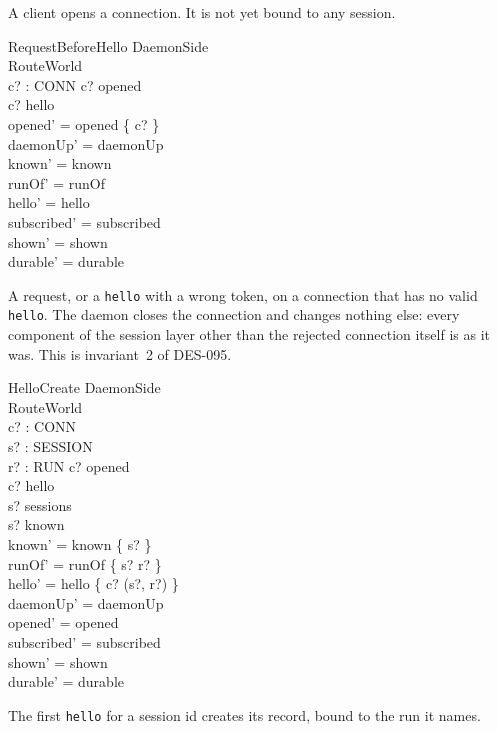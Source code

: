 \documentclass[a4paper,10pt,fleqn]{article}
\begin{document}
A client opens a connection.  It is not yet bound to any session.

\begin{schema}{RequestBeforeHello}
  \Delta DaemonSide \\
  \Xi RouteWorld \\
  c? : CONN
  \where
  c? \in opened \\
  c? \notin \dom hello \\
  opened' = opened \setminus \{ c? \} \\
  daemonUp' = daemonUp \\
  known' = known \\
  runOf' = runOf \\
  hello' = hello \\
  subscribed' = subscribed \\
  shown' = shown \\
  durable' = durable
\end{schema}

A request, or a \texttt{hello} with a wrong token, on a connection that has
no valid \texttt{hello}.  The daemon closes the connection and changes
nothing else: every component of the session layer other than the
rejected connection itself is as it was.  This is invariant~2 of DES-095.

\begin{schema}{HelloCreate}
  \Delta DaemonSide \\
  \Xi RouteWorld \\
  c? : CONN \\
  s? : SESSION \\
  r? : RUN
  \where
  c? \in opened \\
  c? \notin \dom hello \\
  s? \in sessions \\
  s? \notin known \\
  known' = known \cup \{ s? \} \\
  runOf' = runOf \cup \{ s? \mapsto r? \} \\
  hello' = hello \cup \{ c? \mapsto (s?, r?) \} \\
  daemonUp' = daemonUp \\
  opened' = opened \\
  subscribed' = subscribed \\
  shown' = shown \\
  durable' = durable
\end{schema}

The first \texttt{hello} for a session id creates its record, bound to the
run it names.
\end{document}
